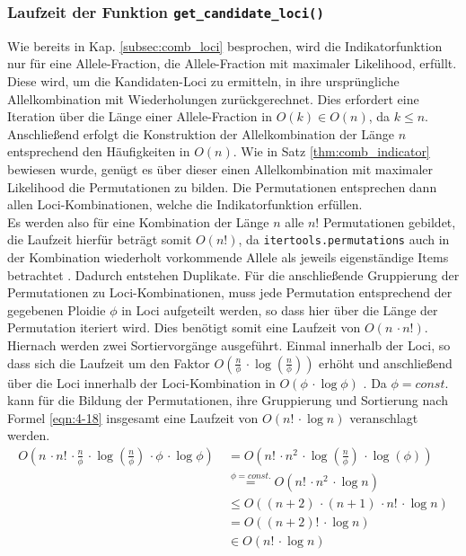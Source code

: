 \subsubsection{Laufzeit der Funktion \lstinline|get_candidate_loci()|}

Wie bereits in Kap. \ref{subsec:comb_loci} besprochen, wird die Indikatorfunktion nur für eine Allele-Fraction, die Allele-Fraction mit maximaler Likelihood, erfüllt. Diese wird, um die \linebreak Kandidaten-Loci zu ermitteln, in ihre ursprüngliche Allelkombination mit Wiederholungen zurückgerechnet. Dies erfordert eine Iteration über die Länge einer Allele-Fraction in $O(k) \in O(n)$, da $k \leq n$. Anschließend erfolgt die Konstruktion der Allelkombination der Länge $n$ entsprechend den Häufigkeiten in $O(n)$. Wie in Satz \ref{thm:comb_indicator} bewiesen wurde, genügt es über dieser einen Allelkombination mit maximaler Likelihood die Permutationen zu bilden. Die Permutationen entsprechen dann allen Loci-Kombinationen, welche die Indikatorfunktion erfüllen. \\

Es werden also für eine Kombination der Länge $n$ alle $n!$ Permutationen gebildet, die Laufzeit hierfür beträgt somit $ O(n!) $, da \lstinline|itertools.permutations| auch in der Kombination wiederholt vorkommende Allele als jeweils eigenständige Items betrachtet \cite{itertools}. Dadurch entstehen Duplikate. Für die anschließende Gruppierung der Permutationen zu Loci-Kombinationen, muss jede Permutation entsprechend der gegebenen Ploidie $\phi$ in Loci aufgeteilt werden, so dass hier über die Länge der Permutation iteriert wird. Dies benötigt somit eine Laufzeit von $O(n  \, \cdotp n!)$. Hiernach werden zwei Sortiervorgänge ausgeführt. Einmal innerhalb der Loci, so dass sich die Laufzeit um den Faktor $ O\left( \frac{n}{\phi}\, \cdotp \log\left( \frac{n}{\phi}\right)\right)  $ erhöht und anschließend über die Loci innerhalb der Loci-Kombination in $O(\phi\, \cdotp \log\phi)$ \cite{python-sort}. Da $\phi = const.$ kann für die Bildung der Permutationen, ihre Gruppierung und Sortierung nach Formel \eqref{eqn:4-18} insgesamt eine Laufzeit von $O\left( n! \, \cdotp \log n \right) $ veranschlagt werden. \\
\begin{equation} \label{eqn:4-18}
\tag{4-18}
\begin{aligned}
O\left( n \, \cdotp n! \, \cdotp \frac{n}{\phi}\, \cdotp \log\left( \frac{n}{\phi}\right) \, \cdotp \phi\, \cdotp \log\phi\right) &\ {} =  O\left( n! \, \cdotp n^2 \, \cdotp \log\left( \frac{n}{\phi}\right) \, \cdotp \log(\phi)\right)\\
&\ \stackrel{\phi = const.}{=} O\left( n! \, \cdotp n^2 \, \cdotp \log n \right)\\
&\ \leq O((n + 2) \, \cdotp (n + 1) \, \cdotp n! \, \cdotp \log n ) \\
&\ = O( (n + 2)! \, \cdotp \log n)\\
&\ \in O(n ! \, \cdotp \log n)
\end{aligned}
\end{equation}


